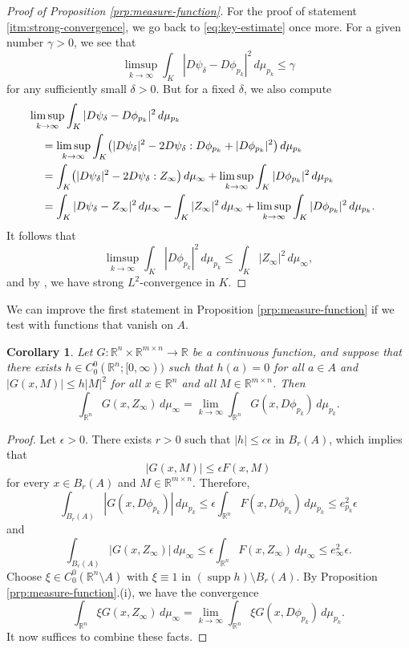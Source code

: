 \documentclass[a4paper]{article}
\newcommand{\R}{\mathbb{R}}
\DeclareMathOperator{\supp}{supp}
\newtheorem{corollary}[theorem]{Corollary}
\theoremstyle{definition}
\theoremstyle{remark}
\begin{document}
\begin{proof}[Proof of Proposition \ref{prp:measure-function}]
For the proof of statement \ref{itm:strong-convergence}, we go back to
\eqref{eq:key-estimate} once more. For a given number $\gamma > 0$, we see
that
\[
\limsup_{k \to \infty} \int_K |D\psi_\delta - D\phi_{p_k}|^2 \, d\mu_{p_k} \le \gamma
\]
for any sufficiently small $\delta > 0$. But for a fixed $\delta$, we also
compute
\[
\begin{split}
\lefteqn{\limsup_{k \to \infty} \int_K |D\psi_\delta - D\phi_{p_k}|^2 \, d\mu_{p_k}} \quad \\
& = \limsup_{k \to \infty} \int_K \bigl(|D\psi_\delta|^2 - 2D\psi_\delta : D\phi_{p_k}  + |D\phi_{p_k}|^2\bigr) \, d\mu_{p_k} \\
& = \int_K \bigl(|D\psi_\delta|^2 - 2D\psi_\delta : Z_\infty\bigr) \, d\mu_\infty + \limsup_{k \to \infty} \int_K |D\phi_{p_k}|^2\, d\mu_{p_k} \\
& = \int_K |D\psi_\delta - Z_\infty|^2 \, d\mu_\infty - \int_K |Z_\infty|^2 \, d\mu_\infty + \limsup_{k \to \infty} \int_K |D\phi_{p_k}|^2\, d\mu_{p_k}.
\end{split}
\]
It follows that
\[
\limsup_{k \to \infty} \int_K |D\phi_{p_k}|^2\, d\mu_{p_k} \le \int_K |Z_\infty|^2 \, d\mu_\infty,
\]
and by \cite[Theorem 4.4.2]{Hutchinson:86}, we have strong $L^2$-convergence
in $K$.
\end{proof}

We can improve the first statement in Proposition \ref{prp:measure-function} if we test
with functions that vanish on $A$.

\begin{corollary} \label{cor:strong-convergence}
Let $G \colon \R^n \times \R^{m \times n} \to \R$ be a continuous function, and suppose that there exists $h \in C_0^0(\R^n; [0, \infty))$ such that
$h(a) = 0$ for all $a \in A$ and $|G(x, M)| \le h|M|^2$ for all $x \in \R^n$ and all $M \in \R^{m \times n}$.
Then
\[
\int_{\R^n} G(x, Z_\infty) \, d\mu_\infty = \lim_{k \to \infty} \int_{\R^n} G(x, D\phi_{p_k}) \, d\mu_{p_k}.
\]
\end{corollary}

\begin{proof}
Let $\epsilon > 0$. There exists $r > 0$ such that $|h| \le c\epsilon$ in $B_r(A)$, which implies that
\[
|G(x, M)| \le \epsilon F(x, M)
\]
for every $x \in B_r(A)$ and $M \in \R^{m \times n}$. Therefore,
\[
\int_{B_r(A)} |G(x, D\phi_{p_k})| \, d\mu_{p_k} \le \epsilon \int_{\R^n} F(x, D\phi_{p_k}) \, d\mu_{p_k} \le e_{p_k}^2 \epsilon
\]
and
\[
\int_{B_r(A)} |G(x, Z_\infty)| \, d\mu_\infty \le \epsilon \int_{\R^n} F(x, Z_\infty) \, d\mu_\infty \le e_\infty^2 \epsilon.
\]
Choose $\xi \in C_0^0(\R^n \setminus A)$ with $\xi \equiv 1$ in $(\supp h) \setminus B_r(A)$.
By Proposition \ref{prp:measure-function}.(i), we have the convergence
\[
\int_{\R^n} \xi G(x, Z_\infty) \, d\mu_\infty = \lim_{k \to \infty} \int_{\R^n} \xi G(x, D\phi_{p_k}) \, d\mu_{p_k}.
\]
It now suffices to combine these facts.
\end{proof}
\end{document}
